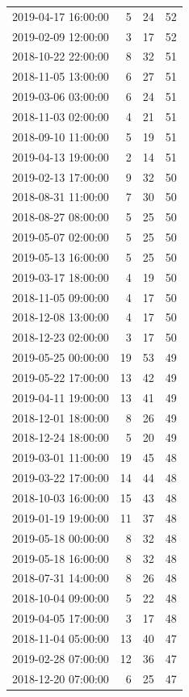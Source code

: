 \begin{tabular}{lrrr}
2019-04-17 16:00:00 & 5 & 24 & 52 \\
2019-02-09 12:00:00 & 3 & 17 & 52 \\
2018-10-22 22:00:00 & 8 & 32 & 51 \\
2018-11-05 13:00:00 & 6 & 27 & 51 \\
2019-03-06 03:00:00 & 6 & 24 & 51 \\
2018-11-03 02:00:00 & 4 & 21 & 51 \\
2018-09-10 11:00:00 & 5 & 19 & 51 \\
2019-04-13 19:00:00 & 2 & 14 & 51 \\
2019-02-13 17:00:00 & 9 & 32 & 50 \\
2018-08-31 11:00:00 & 7 & 30 & 50 \\
2018-08-27 08:00:00 & 5 & 25 & 50 \\
2019-05-07 02:00:00 & 5 & 25 & 50 \\
2019-05-13 16:00:00 & 5 & 25 & 50 \\
2019-03-17 18:00:00 & 4 & 19 & 50 \\
2018-11-05 09:00:00 & 4 & 17 & 50 \\
2018-12-08 13:00:00 & 4 & 17 & 50 \\
2018-12-23 02:00:00 & 3 & 17 & 50 \\
2019-05-25 00:00:00 & 19 & 53 & 49 \\
2019-05-22 17:00:00 & 13 & 42 & 49 \\
2019-04-11 19:00:00 & 13 & 41 & 49 \\
2018-12-01 18:00:00 & 8 & 26 & 49 \\
2018-12-24 18:00:00 & 5 & 20 & 49 \\
2019-03-01 11:00:00 & 19 & 45 & 48 \\
2019-03-22 17:00:00 & 14 & 44 & 48 \\
2018-10-03 16:00:00 & 15 & 43 & 48 \\
2019-01-19 19:00:00 & 11 & 37 & 48 \\
2019-05-18 00:00:00 & 8 & 32 & 48 \\
2019-05-18 16:00:00 & 8 & 32 & 48 \\
2018-07-31 14:00:00 & 8 & 26 & 48 \\
2018-10-04 09:00:00 & 5 & 22 & 48 \\
2019-04-05 17:00:00 & 3 & 17 & 48 \\
2018-11-04 05:00:00 & 13 & 40 & 47 \\
2019-02-28 07:00:00 & 12 & 36 & 47 \\
2018-12-20 07:00:00 & 6 & 25 & 47 \\

\end{tabular}
